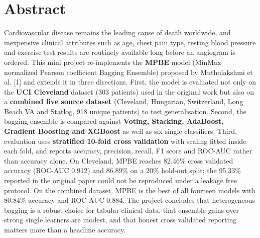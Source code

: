 \documentclass[12pt,a4paper,oneside]{report}
\begin{document}
\chapter*{Abstract}
Cardiovascular disease remains the leading cause of death worldwide, and inexpensive clinical attributes such as age, chest pain type, resting blood pressure and exercise test results are routinely available long before an angiogram is ordered. This mini project re-implements the \textbf{MPBE} model (MinMax normalized Pearson coefficient Bagging Ensemble) proposed by Muthulakshmi et al. [1] and extends it in three directions. First, the model is evaluated not only on the \textbf{UCI Cleveland} dataset (303 patients) used in the original work but also on a \textbf{combined five source dataset} (Cleveland, Hungarian, Switzerland, Long Beach VA and Statlog, 918 unique patients) to test generalisation. Second, the bagging ensemble is compared against \textbf{Voting, Stacking, AdaBoost, Gradient Boosting and XGBoost} as well as six single classifiers. Third, evaluation uses \textbf{stratified 10-fold cross validation} with scaling fitted inside each fold, and reports accuracy, precision, recall, F1 score and ROC-AUC rather than accuracy alone. On Cleveland, MPBE reaches 82.46\% cross validated accuracy (ROC-AUC 0.912) and 86.89\% on a 20\% hold-out split; the 95.33\% reported in the original paper could not be reproduced under a leakage free protocol. On the combined dataset, MPBE is the best of all fourteen models with 80.84\% accuracy and ROC-AUC 0.884. The project concludes that heterogeneous bagging is a robust choice for tabular clinical data, that ensemble gains over strong single learners are modest, and that honest cross validated reporting matters more than a headline accuracy.
\vspace{1.5em}
\par\vspace{0.5em}
{\small\setlength{\parskip}{0pt}\let\clearpage\relax\par\tableofcontents}
\clearpage
\listoffigures
{}
\par\vspace{1.2em}\par
{\let\clearpage\relax \listoftables}
\par\vspace{1.4em}
\par\vspace{0.6em}
\end{document}
